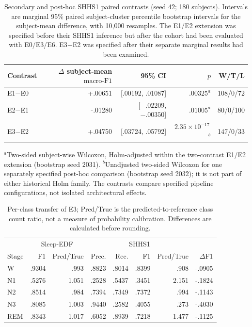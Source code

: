 \documentclass[10pt,a4paper]{article}
\newcommand{\mf}{\ensuremath{\mathrm{macro\text{-}F1}}}
\newcommand{\ci}{95\% CI}
\begin{document}
\begin{table}[H]
\centering\small
\caption{Secondary and post-hoc SHHS1 paired contrasts (seed 42; 180 subjects).
Intervals are marginal 95\% paired subject-cluster percentile bootstrap intervals for the
subject-mean difference, with 10,000 resamples. The E1/E2 extension was specified before their
SHHS1 inference but after the cohort had been evaluated with E0/E3/E6. E3$-$E2 was specified
after their separate marginal results had been examined.}
\label{tab:sup_shhs_secondary_paired}
\begin{tabular}{lrrrr}
\toprule
Contrast & $\Delta$ subject-mean \mf & \ci & $p$ & W/T/L \\
\midrule
E1$-$E0 & +.00651 & [.00192, .01087] & $.00325^{a}$ & 108/0/72 \\
E2$-$E1 & -.01280 & [$-.02209$, $-.00350$] & $.01005^{a}$ & 80/0/100 \\
E3$-$E2 & +.04750 & [.03724, .05792] & $2.35\times10^{-17}$\,$^{b}$ & 147/0/33 \\
\bottomrule
\end{tabular}

\smallskip
\begin{minipage}{0.96\textwidth}\footnotesize
$^{a}$Two-sided subject-wise Wilcoxon, Holm-adjusted within the two-contrast E1/E2 extension
(bootstrap seed 2031). $^{b}$Unadjusted two-sided Wilcoxon for one separately specified post-hoc
comparison (bootstrap seed 2032); it is not part of either historical Holm family. The contrasts
compare specified pipeline configurations, not isolated architectural effects.
\end{minipage}
\end{table}

\begin{table}[H]
\centering\small
\caption{Per-class transfer of E3; Pred/True is the predicted-to-reference class count ratio,
not a measure of probability calibration. Differences are calculated before rounding.}
\label{tab:sup_perclass_transfer}
\begin{tabular}{lrrrrrrr}
\toprule
& \multicolumn{2}{c}{Sleep-EDF} & \multicolumn{4}{c}{SHHS1} & \\
Stage & F1 & Pred/True & Prec. & Rec. & F1 & Pred/True & $\Delta$F1 \\
\midrule
W & .9304 & .993 & .8823 & .8014 & .8399 & .908 & -.0905 \\
N1 & .5276 & 1.051 & .2528 & .5437 & .3451 & 2.151 & -.1824 \\
N2 & .8514 & .984 & .7394 & .7349 & .7372 & .994 & -.1143 \\
N3 & .8085 & 1.003 & .9440 & .2582 & .4055 & .273 & -.4030 \\
REM & .8343 & 1.017 & .6052 & .8939 & .7218 & 1.477 & -.1125 \\
\bottomrule
\end{tabular}
\end{table}
\end{document}
